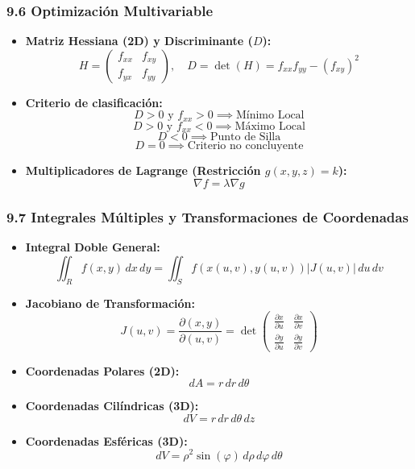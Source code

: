 \documentclass[11pt,a4paper]{article}
\begin{document}
\subsubsection*{9.6 Optimización Multivariable}

\begin{itemize}
  \item \textbf{Matriz Hessiana (2D) y Discriminante ($D$):}
  \[
    H = \begin{pmatrix} f_{xx} & f_{xy} \\ f_{yx} & f_{yy} \end{pmatrix}, \quad D = \det(H) = f_{xx} f_{yy} - (f_{xy})^2
  \]
  \item \textbf{Criterio de clasificación:}
  \[
    D > 0 \text{ y } f_{xx} > 0 \implies \text{Mínimo Local}
  \]
  \[
    D > 0 \text{ y } f_{xx} < 0 \implies \text{Máximo Local}
  \]
  \[
    D < 0 \implies \text{Punto de Silla}
  \]
  \[
    D = 0 \implies \text{Criterio no concluyente}
  \]
  \item \textbf{Multiplicadores de Lagrange (Restricción $g(x,y,z) = k$):}
  \[
    \nabla f = \lambda \nabla g
  \]
\end{itemize}

\subsubsection*{9.7 Integrales Múltiples y Transformaciones de Coordenadas}

\begin{itemize}
  \item \textbf{Integral Doble General:}
  \[
    \iint_R f(x, y) \, dx \, dy = \iint_S f(x(u,v), y(u,v)) |J(u, v)| \, du \, dv
  \]
  \item \textbf{Jacobiano de Transformación:}
  \[
    J(u, v) = \frac{\partial(x, y)}{\partial(u, v)} = \det\begin{pmatrix} \frac{\partial x}{\partial u} & \frac{\partial x}{\partial v} \\ \frac{\partial y}{\partial u} & \frac{\partial y}{\partial v} \end{pmatrix}
  \]
  \item \textbf{Coordenadas Polares (2D):}
  \[
    dA = r \, dr \, d\theta
  \]
  \item \textbf{Coordenadas Cilíndricas (3D):}
  \[
    dV = r \, dr \, d\theta \, dz
  \]
  \item \textbf{Coordenadas Esféricas (3D):}
  \[
    dV = \rho^2 \sin(\varphi) \, d\rho \, d\varphi \, d\theta
  \]
\end{itemize}
\end{document}
